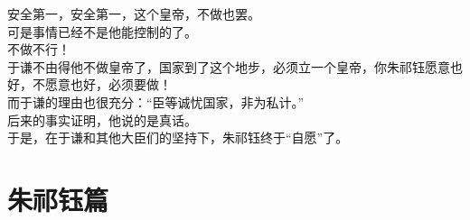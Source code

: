 \begin{multicols}{\theparacolNo}
安全第一，安全第一，这个皇帝，不做也罢。\\

可是事情已经不是他能控制的了。\\

不做不行！\\

于谦不由得他不做皇帝了，国家到了这个地步，必须立一个皇帝，你朱祁钰愿意也好，不愿意也好，必须要做！\\

而于谦的理由也很充分：“臣等诚忧国家，非为私计。”\\

后来的事实证明，他说的是真话。\\

于是，在于谦和其他大臣们的坚持下，朱祁钰终于“自愿”了。\\
\ifnum{}
	\end{multicols}
\fi
\newpage
\chapter*{朱祁钰篇}
